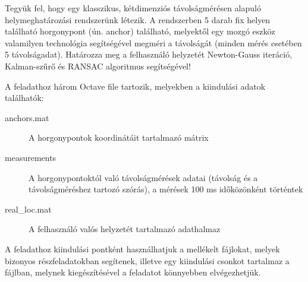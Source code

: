 \newcommand{\bl}{\mathbf{l}}
\newcommand{\bp}{\mathbf{p}}
\newcommand{\br}{\mathbf{r}}
\begin{execise}
	Tegyük fel, hogy egy klasszikus, kétdimenziós távolságmérésen alapuló helymeghatározási rendszerünk létezik. A rendszerben 5 darab fix helyen található horgonypont (ún. anchor) található, melyektől egy mozgó eszköz valamilyen technológia segítségével megméri a távolságát (minden mérés esetében 5 távolságadat). Határozza meg a felhasználó helyzetét Newton-Gauss iteráció, Kalman-szűrő és RANSAC algoritmus segítségével!
	
	A feladathoz három Octave file tartozik, melyekben a kiindulási adatok találhatók:
	\begin{description}
		\item[anchors.mat] A horgonypontok koordinátáit tartalmazó mátrix
		\item[measurements] A horgonypontoktól való távolságmérések adatai (távolság és a távolságméréshez tartozó szórás), a mérések 100 ms időközönként történtek
		\item[real\_loc.mat] A felhasználó valós helyzetét tartalmazó adathalmaz
	\end{description}

	A feladathoz kiindulási pontként használhatjuk a mellékelt fájlokat, melyek bizonyos részfeladatokban segítenek, illetve egy kiindulási csonkot tartalmaz a  fájlban, melynek kiegészítésével a feladatot könnyebben elvégezhetjük.
\end{execise}
